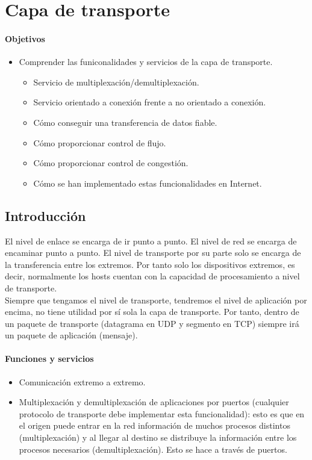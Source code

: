 \chapter{Capa de transporte}

\subsubsection{Objetivos}
\begin{itemize}
    \item Comprender las funiconalidades y servicios de la capa de transporte.
        \begin{itemize}
            \item Servicio de multiplexación/demultiplexación.
            \item Servicio orientado a conexión frente a no orientado a conexión.
            \item Cómo conseguir una transferencia de datos fiable.
            \item Cómo proporcionar control de flujo.
            \item Cómo proporcionar control de congestión.
            \item Cómo se han implementado estas funcionalidades en Internet.
        \end{itemize}
\end{itemize}

\section{Introducción}
El nivel de enlace se encarga de ir punto a punto. El nivel de red se encarga de encaminar punto a punto. El nivel de transporte por su parte solo se encarga de la transferencia entre los extremos. Por tanto solo los dispositivos extremos, es decir, normalmente los hosts cuentan con la capacidad de procesamiento a nivel de transporte. \\

Siempre que tengamos el nivel de transporte, tendremos el nivel de aplicación por encima, no tiene utilidad por sí sola la capa de transporte. Por tanto, dentro de un paquete de transporte (datagrama en UDP y segmento en TCP) siempre irá un paquete de aplicación (mensaje).\\

\subsubsection{Funciones y servicios}
\begin{itemize}
    \item Comunicación extremo a extremo.
    \item Multiplexación y demultiplexación de aplicaciones por puertos (cualquier protocolo de transporte debe implementar esta funcionalidad): esto es que en el origen puede entrar en la red información de muchos procesos distintos (multiplexación) y al llegar al destino se distribuye la información entre los procesos necesarios (demultiplexación). Esto se hace a través de puertos. 
\end{itemize}

